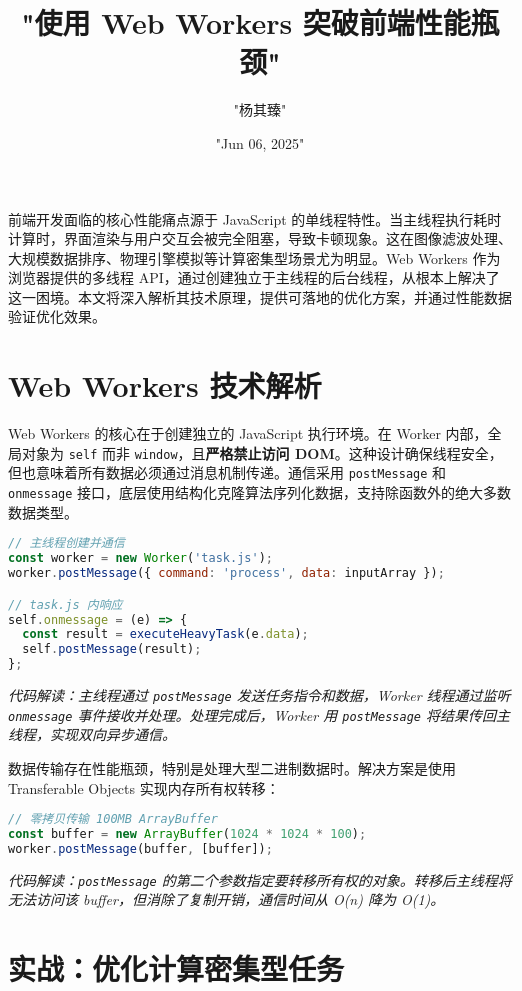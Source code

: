 \title{"使用 Web Workers 突破前端性能瓶颈"}
\author{"杨其臻"}
\date{"Jun 06, 2025"}
\maketitle
前端开发面临的核心性能痛点源于 JavaScript 的单线程特性。当主线程执行耗时计算时，界面渲染与用户交互会被完全阻塞，导致卡顿现象。这在图像滤波处理、大规模数据排序、物理引擎模拟等计算密集型场景尤为明显。Web Workers 作为浏览器提供的多线程 API，通过创建独立于主线程的后台线程，从根本上解决了这一困境。本文将深入解析其技术原理，提供可落地的优化方案，并通过性能数据验证优化效果。\par
\chapter{Web Workers 技术解析}
Web Workers 的核心在于创建独立的 JavaScript 执行环境。在 Worker 内部，全局对象为 \texttt{self} 而非 \texttt{window}，且\textbf{严格禁止访问 DOM}。这种设计确保线程安全，但也意味着所有数据必须通过消息机制传递。通信采用 \texttt{postMessage} 和 \texttt{onmessage} 接口，底层使用结构化克隆算法序列化数据，支持除函数外的绝大多数数据类型。\par
\begin{lstlisting}[language=javascript]
// 主线程创建并通信
const worker = new Worker('task.js');
worker.postMessage({ command: 'process', data: inputArray });

// task.js 内响应
self.onmessage = (e) => {
  const result = executeHeavyTask(e.data);
  self.postMessage(result);
};
\end{lstlisting}
\textit{代码解读：主线程通过 \texttt{postMessage} 发送任务指令和数据，Worker 线程通过监听 \texttt{onmessage} 事件接收并处理。处理完成后，Worker 用 \texttt{postMessage} 将结果传回主线程，实现双向异步通信。}\par
数据传输存在性能瓶颈，特别是处理大型二进制数据时。解决方案是使用 Transferable Objects 实现内存所有权转移：\par
\begin{lstlisting}[language=javascript]
// 零拷贝传输 100MB ArrayBuffer
const buffer = new ArrayBuffer(1024 * 1024 * 100);
worker.postMessage(buffer, [buffer]); 
\end{lstlisting}
\textit{代码解读：\texttt{postMessage} 的第二个参数指定要转移所有权的对象。转移后主线程将无法访问该 buffer，但消除了复制开销，通信时间从 O(n) 降为 O(1)。}\par
\chapter{实战：优化计算密集型任务}
